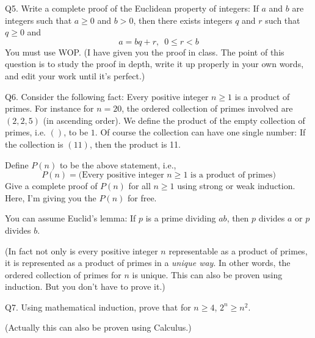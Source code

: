 \SOLUTION



\newpage
Q5. Write a complete proof of the Euclidean property of integers:
If $a$ and $b$ are integers such that $a \geq 0$ and $b > 0$,
then there exists integers $q$ and $r$ such that $q \geq 0$ and
\[
a = bq + r, \,\,\, 0 \leq r < b
\]
You must use WOP.
(I have given you the proof in class.
The point of this question is to study the proof in depth, write it up
properly in your own words, and edit your work until it's perfect.) 

\SOLUTION



\newpage


\newpage
Q6.
Consider the following fact:
Every positive integer $n \geq 1$ is a product of primes.
For instance for $n = 20$,
the ordered collection of primes involved are $(2, 2, 5)$ (in ascending order).
We define the product of the empty collection of primes, i.e. $()$, to be $1$.
Of course the collection can have one single number:
If the collection is $(11)$, then the product is 11.

Define $P(n)$ to be the above statement, i.e.,
\[
  P(n) =
  \biggl(
  \text{Every positive integer $n \geq 1$ is a product of primes}
  \biggr)
\]
Give a complete proof of $P(n)$ for all $n \geq 1$
using strong or weak induction.
Here, I'm giving you the $P(n)$ for free.

You can assume Euclid's lemma: If $p$ is a prime dividing $ab$,
then $p$ divides $a$ or $p$ divides $b$.

(In fact not only is every positive integer $n$ representable
as a product of primes,
it is represented as a product of primes in a \textit{unique way}.
In other words, the ordered collection of primes for $n$ is unique.
This can also be proven using induction.
But you don't have to prove it.)

\SOLUTION



\newpage
Q7.
Using mathematical induction, 
prove that for $n \geq 4$, $2^n \geq n^2$.

(Actually this can also be proven using Calculus.)

